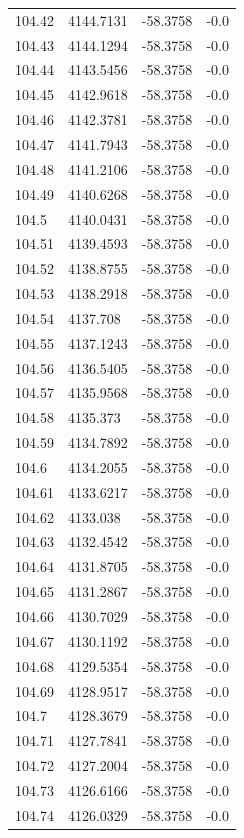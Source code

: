 \begin{table}[H]
\begin{tabular}{llll}
104.42 & 4144.7131 & -58.3758 & -0.0 \\
104.43 & 4144.1294 & -58.3758 & -0.0 \\
104.44 & 4143.5456 & -58.3758 & -0.0 \\
104.45 & 4142.9618 & -58.3758 & -0.0 \\
104.46 & 4142.3781 & -58.3758 & -0.0 \\
104.47 & 4141.7943 & -58.3758 & -0.0 \\
104.48 & 4141.2106 & -58.3758 & -0.0 \\
104.49 & 4140.6268 & -58.3758 & -0.0 \\
104.5 & 4140.0431 & -58.3758 & -0.0 \\
104.51 & 4139.4593 & -58.3758 & -0.0 \\
104.52 & 4138.8755 & -58.3758 & -0.0 \\
104.53 & 4138.2918 & -58.3758 & -0.0 \\
104.54 & 4137.708 & -58.3758 & -0.0 \\
104.55 & 4137.1243 & -58.3758 & -0.0 \\
104.56 & 4136.5405 & -58.3758 & -0.0 \\
104.57 & 4135.9568 & -58.3758 & -0.0 \\
104.58 & 4135.373 & -58.3758 & -0.0 \\
104.59 & 4134.7892 & -58.3758 & -0.0 \\
104.6 & 4134.2055 & -58.3758 & -0.0 \\
104.61 & 4133.6217 & -58.3758 & -0.0 \\
104.62 & 4133.038 & -58.3758 & -0.0 \\
104.63 & 4132.4542 & -58.3758 & -0.0 \\
104.64 & 4131.8705 & -58.3758 & -0.0 \\
104.65 & 4131.2867 & -58.3758 & -0.0 \\
104.66 & 4130.7029 & -58.3758 & -0.0 \\
104.67 & 4130.1192 & -58.3758 & -0.0 \\
104.68 & 4129.5354 & -58.3758 & -0.0 \\
104.69 & 4128.9517 & -58.3758 & -0.0 \\
104.7 & 4128.3679 & -58.3758 & -0.0 \\
104.71 & 4127.7841 & -58.3758 & -0.0 \\
104.72 & 4127.2004 & -58.3758 & -0.0 \\
104.73 & 4126.6166 & -58.3758 & -0.0 \\
104.74 & 4126.0329 & -58.3758 & -0.0 \\

\end{tabular}
\end{table}
